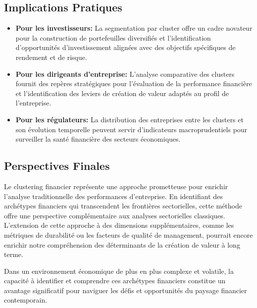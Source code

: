 \documentclass[12pt]{article}
\begin{document}
\subsection{Implications Pratiques}
\begin{itemize}
    \item \textbf{Pour les investisseurs:} La segmentation par cluster offre un cadre novateur pour la construction de portefeuilles diversifiés et l'identification d'opportunités d'investissement alignées avec des objectifs spécifiques de rendement et de risque.
    
    \item \textbf{Pour les dirigeants d'entreprise:} L'analyse comparative des clusters fournit des repères stratégiques pour l'évaluation de la performance financière et l'identification des leviers de création de valeur adaptés au profil de l'entreprise.
    
    \item \textbf{Pour les régulateurs:} La distribution des entreprises entre les clusters et son évolution temporelle peuvent servir d'indicateurs macroprudentiels pour surveiller la santé financière des secteurs économiques.
\end{itemize}

\subsection{Perspectives Finales}
Le clustering financier représente une approche prometteuse pour enrichir l'analyse traditionnelle des performances d'entreprise. En identifiant des archétypes financiers qui transcendent les frontières sectorielles, cette méthode offre une perspective complémentaire aux analyses sectorielles classiques. L'extension de cette approche à des dimensions supplémentaires, comme les métriques de durabilité ou les facteurs de qualité de management, pourrait encore enrichir notre compréhension des déterminants de la création de valeur à long terme.

Dans un environnement économique de plus en plus complexe et volatile, la capacité à identifier et comprendre ces archétypes financiers constitue un avantage significatif pour naviguer les défis et opportunités du paysage financier contemporain.
\end{document}
